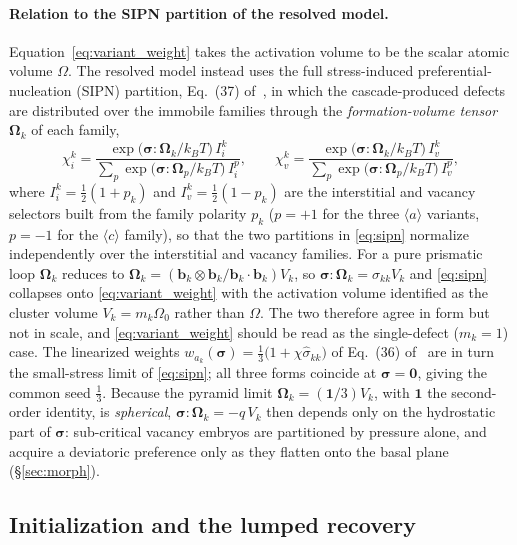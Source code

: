 \documentclass[11pt]{article}
\newcommand{\sig}{\bm{\sigma}}
\newcommand{\Oh}{\Omega}
\newcommand{\kb}{k_{B}}
\begin{document}
\paragraph{Relation to the SIPN partition of the resolved model.}
Equation~\eqref{eq:variant_weight} takes the activation volume to be the scalar
atomic volume $\Oh$. The resolved model instead uses the full stress-induced
preferential-nucleation (SIPN) partition, Eq.~(37)
of~\cite{PoGhoniem2026D1M1}, in which the cascade-produced defects are
distributed over the immobile families through the \emph{formation-volume
tensor} $\bm\Omega_k$ of each family,
\begin{equation}
\label{eq:sipn}
    \chi^k_{i}
    =
    \frac{\exp\!\big(\sig\!:\!\bm\Omega_k/\kb T\big)\,I^k_{i}}
         {\sum_{p}\exp\!\big(\sig\!:\!\bm\Omega_p/\kb T\big)\,I^p_{i}},
    \qquad
    \chi^k_{v}
    =
    \frac{\exp\!\big(\sig\!:\!\bm\Omega_k/\kb T\big)\,I^k_{v}}
         {\sum_{p}\exp\!\big(\sig\!:\!\bm\Omega_p/\kb T\big)\,I^p_{v}},
\end{equation}
where $I^k_i=\tfrac12(1+p_k)$ and $I^k_v=\tfrac12(1-p_k)$ are the interstitial and
vacancy selectors built from the family polarity $p_k$ ($p=+1$ for the three
$\langle a\rangle$ variants, $p=-1$ for the $\langle c\rangle$ family), so that
the two partitions in \eqref{eq:sipn} normalize independently over the
interstitial and vacancy families. For a pure prismatic loop $\bm\Omega_k$
reduces to
$\bm\Omega_k=(\mathbf b_k\otimes\mathbf b_k/\mathbf b_k\!\cdot\!\mathbf b_k)V_k$,
so $\sig\!:\!\bm\Omega_k=\sigma_{kk}V_k$ and \eqref{eq:sipn} collapses onto
\eqref{eq:variant_weight} with the activation volume identified as the cluster
volume $V_k=m_k\Oh_0$ rather than $\Oh$. The two therefore agree in form but not
in scale, and \eqref{eq:variant_weight} should be read as the single-defect
($m_k=1$) case. The linearized weights
$w_{a_k}(\sig)=\tfrac13\big(1+\chi\hat\sigma_{kk}\big)$ of Eq.~(36)
of~\cite{PoGhoniem2026D1M1} are in turn the small-stress limit of
\eqref{eq:sipn}; all three forms coincide at $\sig=\mathbf0$, giving the common
seed $\tfrac13$. Because the pyramid limit
$\bm\Omega_k=(\mathbf 1/3)V_k$, with $\mathbf 1$ the second-order identity, is
\emph{spherical}, $\sig\!:\!\bm\Omega_k=-q\,V_k$ then depends only on the
hydrostatic part of $\sig$: sub-critical vacancy embryos are
partitioned by pressure alone, and acquire a deviatoric preference only as they
flatten onto the basal plane (\S\ref{sec:morph}).

\subsection{Initialization and the lumped recovery}
\end{document}

